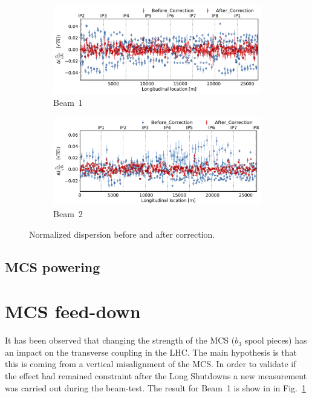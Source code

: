 \documentclass{cernatsnote}
\begin{document}
\begin{figure}[ht]
\begin{subfigure}{.5\textwidth}
  \centering
  \includegraphics[width=.8\linewidth]{inj_linear/beamtest/beam1/Normalized_disp_before_vs_after_corection.pdf}  
  \caption{Beam~1}
\end{subfigure}
\begin{subfigure}{.5\textwidth}
  \centering
  \includegraphics[width=.8\linewidth]{inj_linear/beamtest/beam2/ndisp_before_after_correction.pdf}  
  \caption{Beam~2}
\end{subfigure}
\caption{Normalized dispersion before and after correction.}
\label{fig:before_after_correction_beta_beat}
\end{figure}




\subsection{MCS powering}
\section{MCS feed-down}

It has been observed that changing the strength of the MCS ($b_3$ spool pieces) has an impact on the transverse coupling in the LHC. The main hypothesis is that this is coming from a vertical misalignment of the MCS. In order to validate if the effect had remained constraint after the Long Shutdowns a new measurement was carried out during the beam-test. The result for Beam~1 is show in in Fig.~\ref{}
\end{document}

